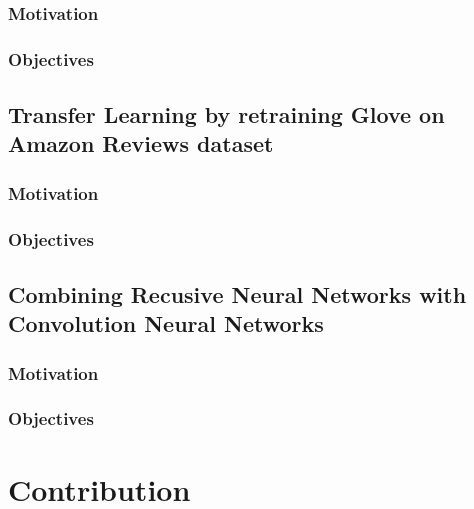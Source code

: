 \subsubsection{Motivation}

\subsubsection{Objectives}
\subsection{Transfer Learning by retraining Glove on Amazon Reviews dataset}
\subsubsection{Motivation}

\subsubsection{Objectives}
\subsection{Combining Recusive Neural Networks with Convolution Neural Networks}
\subsubsection{Motivation}

\subsubsection{Objectives}

\section{Contribution}


